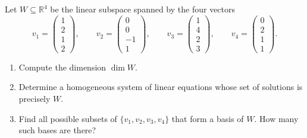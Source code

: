 \begin{exercise}
\label{exc:subspace_dimension_equations_basis_selection}
Let $W \subseteq \mathbb{R}^4$ be the linear subspace spanned by the four vectors
\[
v_1 = \begin{pmatrix} 1 \\ 2 \\ 1 \\ 2 \end{pmatrix}, \qquad
v_2 = \begin{pmatrix} 0 \\ 0 \\ -1 \\ 1 \end{pmatrix}, \qquad
v_3 = \begin{pmatrix} 1 \\ 4 \\ 2 \\ 3 \end{pmatrix}, \qquad
v_4 = \begin{pmatrix} 0 \\ 2 \\ 1 \\ 1 \end{pmatrix}.
\]
\begin{enumerate}
    \item Compute the dimension $\dim W$.
    \item Determine a homogeneous system of linear equations whose set of solutions is precisely $W$.
    \item Find all possible subsets of $\{v_1, v_2, v_3, v_4\}$ that form a basis of $W$. How many such bases are there?
\end{enumerate}
\end{exercise}

